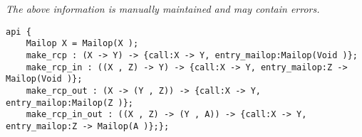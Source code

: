 \label{api:Simple\_Rpc}

{\tiny \it The above information is manually maintained and may contain errors.}
\begin{verbatim}
api {
    Mailop X = Mailop(X );
    make_rcp : (X -> Y) -> {call:X -> Y, entry_mailop:Mailop(Void )};
    make_rcp_in : ((X , Z) -> Y) -> {call:X -> Y, entry_mailop:Z -> Mailop(Void )};
    make_rcp_out : (X -> (Y , Z)) -> {call:X -> Y, entry_mailop:Mailop(Z )};
    make_rcp_in_out : ((X , Z) -> (Y , A)) -> {call:X -> Y, entry_mailop:Z -> Mailop(A )};};
\end{verbatim}
